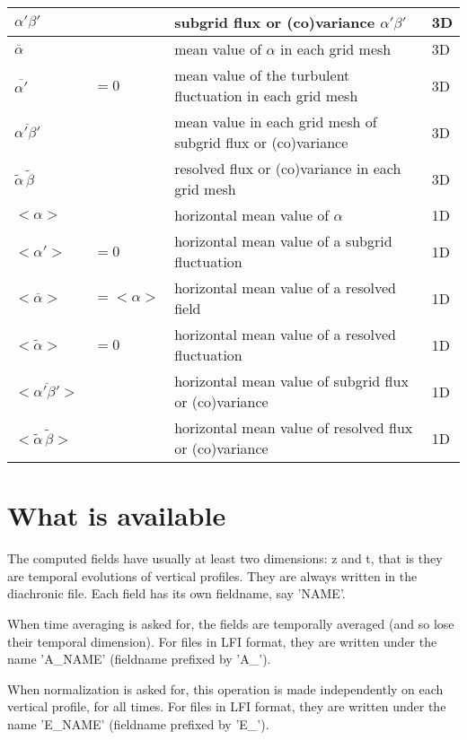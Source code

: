 \begin{center}
\begin{tabular}{|l|l|l|l|}
\hline
$\alpha'\beta'$ & & subgrid flux or (co)variance  $\alpha'\beta'$ & 3D \\
\hline
$\overline{\alpha}$  & & mean value of $\alpha$ in each grid mesh & 3D \\
\hline
$\overline{\alpha'}$  & $= 0$ & mean value of the turbulent fluctuation in each grid mesh & 3D \\
\hline
$\overline{\alpha'\beta'}$ & & mean value in each grid mesh of subgrid flux or (co)variance & 3D\\
\hline
$\tilde{\alpha}\,\tilde{\beta}$ & & resolved flux or (co)variance in each grid mesh & 3D\\
\hline
$<\alpha>$ & &  horizontal mean value of $\alpha$ & 1D \\
\hline
$<\alpha'>$ & $=0$ &  horizontal mean value of a subgrid fluctuation & 1D\\
\hline
$<\overline{\alpha}>$ & $= <\alpha>$ &  horizontal mean value of a resolved field& 1D\\
\hline
$<\tilde{\alpha}>$ & $= 0$ &  horizontal mean value of a resolved fluctuation& 1D\\
\hline
$<\overline{\alpha'\beta'}>$ & & horizontal mean value of subgrid flux or (co)variance & 1D\\
\hline
$<\tilde{\alpha}\,\tilde{\beta}>$ & & horizontal mean value of resolved flux or (co)variance & 1D\\
\hline
\end{tabular}
\end{center}


\section{What is available}

The computed fields have usually at least two
dimensions: z and t, that is they are temporal evolutions
of vertical profiles. They are always written in the 
diachronic file. Each field has its own fieldname, say 'NAME'.

When time averaging is asked for, the fields are temporally
averaged (and so lose their temporal dimension). For files in LFI format, they are written
under the name 'A\_NAME' (fieldname prefixed by 'A\_').

When normalization is asked for, this operation is made independently on
each vertical profile, for all times. For files in LFI format, they are written under
the name 'E\_NAME' (fieldname prefixed by 'E\_').

